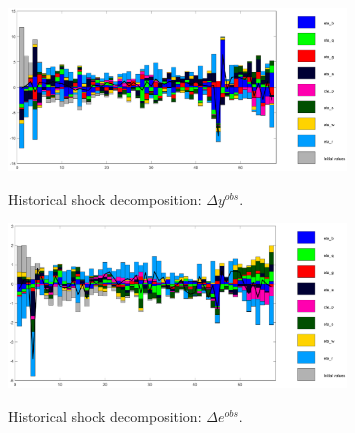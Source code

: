  
\begin{figure}[H]
\centering 
\includegraphics[width=0.8\textwidth]{EA_SWW14_rep/graphs/EA_SWW14_rep_shock_decomposition_dy_obs}
\label{Fig:shock_decomp:dy_obs}
\caption{Historical shock decomposition: $ {\Delta y^{obs}} $.}
\end{figure}
 
\begin{figure}[H]
\centering 
\includegraphics[width=0.8\textwidth]{EA_SWW14_rep/graphs/EA_SWW14_rep_shock_decomposition_de_obs}
\label{Fig:shock_decomp:de_obs}
\caption{Historical shock decomposition: $ {\Delta e^{obs}} $.}
\end{figure}
 
 
